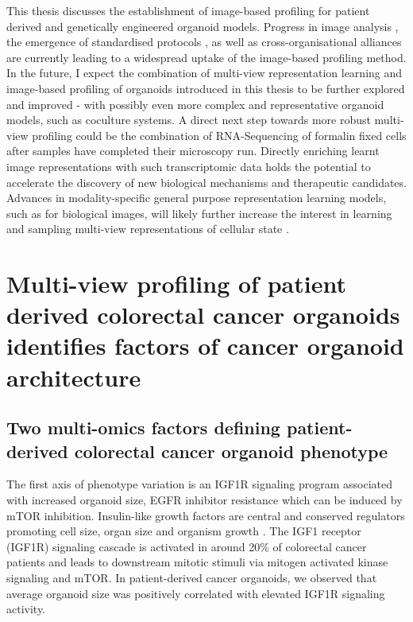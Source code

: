 \begin{flushleft}
\bigbreak


This thesis discusses the establishment of image-based profiling for patient derived and genetically engineered organoid models. Progress in image analysis \citep{chandrasekaranImagebasedProfilingDrug2021a}, the emergence of standardised protocols \citep{Bray2016-ue}, as well as cross-organisational alliances \citep{chandrasekaranJUMPCellPainting2023} are currently leading to a widespread uptake of the image-based profiling method. In the future, I expect the combination of multi-view representation learning and image-based profiling of organoids introduced in this thesis to be further explored and improved - with possibly even more complex and representative organoid models, such as coculture systems. A direct next step towards more robust multi-view profiling could be the combination of RNA-Sequencing of formalin fixed cells after samples have completed their microscopy run. Directly enriching learnt image representations with such transcriptomic data holds the potential to accelerate the discovery of new biological mechanisms and therapeutic candidates. Advances in modality-specific general purpose representation learning models, such as for biological images, will likely further increase the interest in learning and sampling multi-view representations of cellular state \citep{pfaendlerSelfsupervisedVisionTransformers2023}.



\section{Multi-view profiling of patient derived colorectal cancer organoids identifies factors of cancer organoid architecture}



\subsection{Two multi-omics factors defining patient-derived colorectal cancer organoid phenotype}

The first axis of phenotype variation is an IGF1R signaling program associated with increased organoid size, EGFR inhibitor resistance which can be induced by mTOR inhibition. Insulin-like growth factors are central and conserved regulators promoting cell size, organ size and organism growth \citep{pucheHumanConditionsInsulinlike2012, sunMechanismCellSize2006}. The IGF1 receptor (IGF1R) signaling cascade is activated in around 20\% of colorectal cancer patients and leads to downstream mitotic stimuli via mitogen activated kinase signaling and mTOR\citep{zhongOverproductionIGF2Drives2017}. In patient-derived cancer organoids, we observed that average organoid size was positively correlated with elevated IGF1R signaling activity.
\smallbreak


\end{flushleft}
